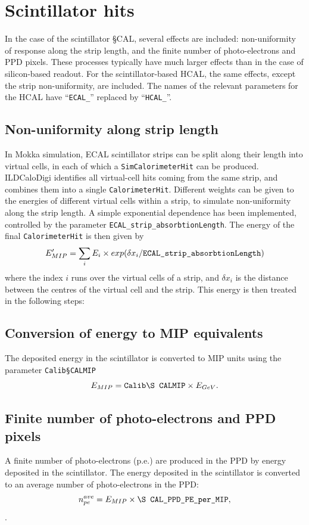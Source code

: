 \documentclass[12pt]{article} %
\begin{document}
\section{Scintillator hits}
\label{sec:scintdigi}


In the case of the scintillator \S CAL, several effects are included: non-uniformity of response along the strip length,
and the finite number of photo-electrons and PPD pixels. 
These processes typically have much larger effects than in the case of silicon-based readout.
For the scintillator-based HCAL, the same effects, except the strip non-uniformity, are included. 
The names of the relevant parameters for the HCAL have ``{\tt ECAL\_}'' replaced by ``{\tt HCAL\_}''.

\subsection*{Non-uniformity along strip length}
In Mokka simulation, ECAL scintillator strips can be split along their length into virtual cells, 
in each of which a {\tt SimCalorimeterHit} can be produced. 
ILDCaloDigi identifies all virtual-cell hits coming from the same strip, and combines them into a single {\tt CalorimeterHit}.
Different weights can be given to the energies of different virtual cells within a strip, to simulate non-uniformity
along the strip length. A simple exponential dependence has been implemented, controlled by the parameter
{\tt ECAL\_strip\_absorbtionLength}. The energy of the final {\tt CalorimeterHit} is then given by
\begin{equation*}
E'_{MIP} = \sum_{i} E_{i} \times exp( \delta x_i / \text{\tt ECAL\_strip\_absorbtionLength} )
\end{equation*}
where the index $i$ runs over the virtual cells of a strip, and $\delta x_i$ is the distance between the 
centres of the virtual cell and the strip. This energy is then treated in the following steps:

\subsection*{Conversion of energy to MIP equivalents}
The deposited energy in the scintillator is converted to MIP units using the parameter {\tt Calib\S CALMIP}
\begin{equation*}
E_{MIP} = \text{\tt Calib\S CALMIP} \times E_{GeV} .
\end{equation*}

\subsection*{Finite number of photo-electrons and PPD pixels}
A finite number of photo-electrons (p.e.) are produced in the PPD by energy deposited in the scintillator.
The energy deposited in the scintillator is converted to an average number of photo-electrons in the PPD:
\begin{equation*}
n_{pe}^{ave} = E_{MIP} \times \text{\tt \S CAL\_PPD\_PE\_per\_MIP},
\end{equation*}.
\end{document}
